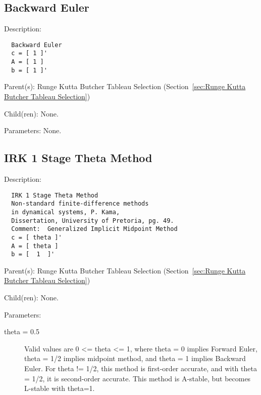 \subsection{Backward Euler}
\label{sec:Backward Euler-Runge Kutta Butcher Tableau Selection}

\begin{list}{}
  {\setlength{\leftmargin}{1.0in}
   \setlength{\labelwidth}{0.75in}
   \setlength{\labelsep}{0.125in}}
  \item[Description:]
\begin{verbatim}
  Backward Euler
  c = [ 1 ]'
  A = [ 1 ]
  b = [ 1 ]'
\end{verbatim}
  \item[Parent(s):]
    Runge Kutta Butcher Tableau Selection (Section~\ref{sec:Runge Kutta Butcher Tableau Selection})
  \item[Child(ren):]
    None. 
  \item[Parameters:]
    None. 
\end{list}

\subsection{IRK 1 Stage Theta Method}
\label{sec:IRK 1 Stage Theta Method}

\begin{list}{}
  {\setlength{\leftmargin}{1.0in}
   \setlength{\labelwidth}{0.75in}
   \setlength{\labelsep}{0.125in}}
  \item[Description:]
\begin{verbatim}
  IRK 1 Stage Theta Method
  Non-standard finite-difference methods
  in dynamical systems, P. Kama,
  Dissertation, University of Pretoria, pg. 49.
  Comment:  Generalized Implicit Midpoint Method
  c = [ theta ]'
  A = [ theta ]
  b = [  1  ]'
\end{verbatim}
  \item[Parent(s):]
    Runge Kutta Butcher Tableau Selection (Section~\ref{sec:Runge Kutta Butcher Tableau Selection})
  \item[Child(ren):]
    None. 
  \item[Parameters:]
    \begin{description}
      \item[theta = 0.5] 
Valid values are 0 <= theta <= 1, where theta = 0 implies Forward Euler, theta = 1/2 implies midpoint method, and theta = 1 implies Backward Euler. For theta != 1/2, this method is first-order accurate, and with theta = 1/2, it is second-order accurate.  This method is A-stable, but becomes L-stable with theta=1.
\end{description}

\end{list}

